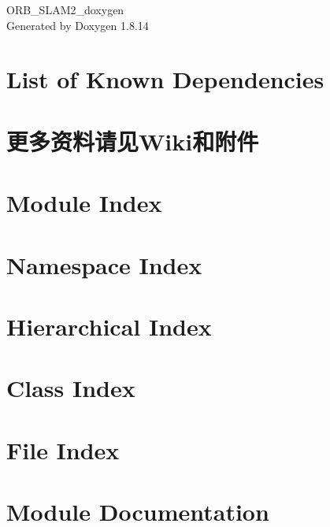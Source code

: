 \documentclass[twoside]{book}
\newcommand{\+}{\discretionary{\mbox{\scriptsize$\hookleftarrow$}}{}{}}
\newcommand{\clearemptydoublepage}{%
  \newpage{\pagestyle{empty}\cleardoublepage}%
}
\begin{document}
\hypersetup{pageanchor=false,
             bookmarksnumbered=true,
             pdfencoding=unicode
            }
\begin{titlepage}
\vspace*{7cm}
\begin{center}%
{\Large O\+R\+B\+\_\+\+S\+L\+A\+M2\+\_\+doxygen }\\
\vspace*{1cm}
{\large Generated by Doxygen 1.8.14}\\
\end{center}
\end{titlepage}
\clearemptydoublepage
{}
\tableofcontents
\clearemptydoublepage
{}
\hypersetup{pageanchor=true}

\chapter{List of Known Dependencies}
\label{md__dependencies}

\chapter{更多资料请见\+Wiki和附件}
\label{md__r_e_a_d_m_e}

\chapter{Module Index}

\chapter{Namespace Index}

\chapter{Hierarchical Index}

\chapter{Class Index}

\chapter{File Index}

\chapter{Module Documentation}



\end{document}
